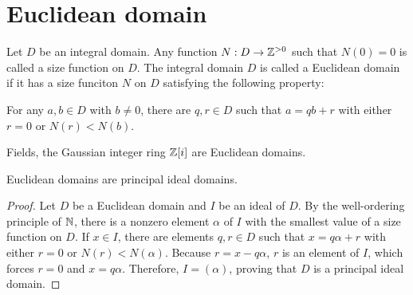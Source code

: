 \section{Euclidean domain}

\begin{defi}
    Let $D$ be an integral domain.
    Any function $N: D\rightarrow{\mathbb{Z}}^{>0}$ such that $N(0)=0$ is called a size function on $D$.
    The integral domain $D$ is called a Euclidean domain if it has a size funciton $N$ on $D$ satisfying the following property:
    \begin{center}
        For any $a, b\in D$ with $b\neq 0$, there are $q, r\in D$ such that $a=qb+r$ with either $r=0$ or $N(r)<N(b)$.
    \end{center}
\end{defi}
\begin{exmp}
    Fields, the Gaussian integer ring ${\mathbb{Z}}[i]$ are Euclidean domains.
\end{exmp}

\begin{thm}
    Euclidean domains are principal ideal domains.
\end{thm}
\begin{proof}
    Let $D$ be a Euclidean domain and $I$ be an ideal of $D$.
    By the well-ordering principle of ${\mathbb{N}}$, there is a nonzero element $\alpha$ of $I$ with the smallest value of a size function on $D$.
    If $x\in I$, there are elements $q, r\in D$ such that $x=q\alpha+r$ with either $r=0$ or $N(r)<N(\alpha)$.
    Because $r=x-q\alpha$, $r$ is an element of $I$, which forces $r=0$ and $x=q\alpha$.
    Therefore, $I=(\alpha)$, proving that $D$ is a principal ideal domain.
\end{proof}